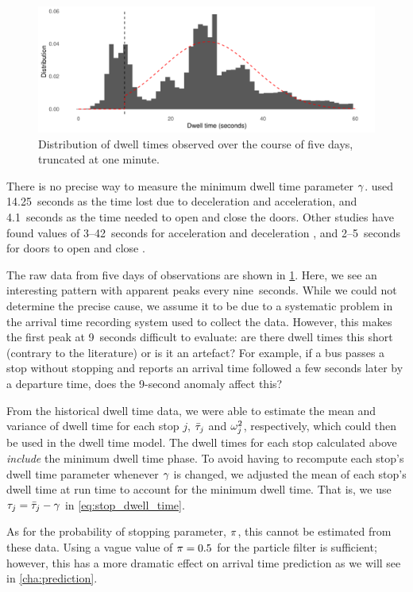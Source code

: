 \begin{knitrout}\small
{}\color{fgcolor}\begin{figure}
\includegraphics[width=\linewidth]{figure/observed_dwell-1} \caption[Distribution of dwell times observed over the course of five days, truncated at one minute]{Distribution of dwell times observed over the course of five days, truncated at one minute.}\label{fig:observed_dwell}
\end{figure}


\end{knitrout}

There is no precise way to measure the minimum dwell time parameter $\gamma$. \citet{Hans_2015} used 14.25~seconds as the time lost due to deceleration and acceleration, and 4.1~seconds as the time needed to open and close the doors. Other studies have found values of 3--42~seconds for acceleration and deceleration \citep{Robinson_2013}, and 2--5~seconds for doors to open and close \citep{Meng_2013}.



The raw data from five days of observations are shown in \cref{fig:observed_dwell}. Here, we see an interesting pattern with apparent peaks every nine~seconds. While we could not determine the precise cause, we assume it to be due to a systematic problem in the arrival time recording system used to collect the data. However, this makes the first peak at 9~seconds difficult to evaluate: are there dwell times this short (contrary to the literature) or is it an artefact? For example, if a bus passes a stop without stopping and reports an arrival time followed a few seconds later by a departure time, does the 9-second anomaly affect this?

From the historical dwell time data, we were able to estimate the mean and variance of dwell time for each stop $j$, $\bar{\tau}_j$ and $\omega^2_j$, respectively, which could then be used in the dwell time model. The dwell times for each stop calculated above \emph{include} the minimum dwell time phase. To avoid having to recompute each stop's dwell time parameter whenever $\gamma$ is changed, we adjusted the mean of each stop's dwell time at run time to account for the minimum dwell time. That is, we use $\tau_j = \bar{\tau}_j - \gamma$ in \cref{eq:stop_dwell_time}.

As for the probability of stopping parameter, $\pi$, this cannot be estimated from these data. Using a vague value of $\pi=0.5$ for the particle filter is sufficient; however, this has a more dramatic effect on arrival time prediction as we will see in \cref{cha:prediction}.
